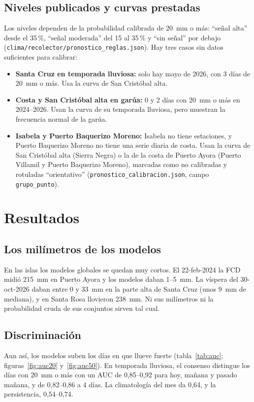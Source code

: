 \documentclass{sosg-informe}
\begin{document}
\subsection{Niveles publicados y curvas prestadas}
Los niveles dependen de la probabilidad calibrada de 20~mm o más: \enquote{señal alta} desde el 35\,\%, \enquote{señal moderada} del 15 al 35\,\% y \enquote{sin señal} por debajo (\texttt{clima/recolector/pronostico\_reglas.json}). Hay tres casos sin datos suficientes para calibrar:
\begin{itemize}
  \item \textbf{Santa Cruz en temporada lluviosa:} solo hay mayo de 2026, con 3 días de 20~mm o más. Usa la curva de San Cristóbal alta.
  \item \textbf{Costa y San Cristóbal alta en garúa:} 0 y 2 días con 20~mm o más en 2024--2026. Usan la curva de su temporada lluviosa, pero muestran la frecuencia normal de la garúa.
  \item \textbf{Isabela y Puerto Baquerizo Moreno:} Isabela no tiene estaciones, y Puerto Baquerizo Moreno no tiene una serie diaria de costa. Usan la curva de San Cristóbal alta (Sierra Negra) o la de la costa de Puerto Ayora (Puerto Villamil y Puerto Baquerizo Moreno), marcadas como no calibradas y rotuladas \enquote{orientativo} (\texttt{pronostico\_calibracion.json}, campo \texttt{grupo\_punto}).
\end{itemize}

\section{Resultados}

\subsection{Los milímetros de los modelos}
En las islas los modelos globales se quedan muy cortos. El 22-feb-2024 la FCD midió 215~mm en Puerto Ayora y los modelos daban 1--5~mm. La víspera del 30-oct-2026 daban entre 0 y 33~mm en la parte alta de Santa Cruz (unos 9~mm de mediana), y en Santa Rosa llovieron 238~mm. Ni sus milímetros ni la probabilidad cruda de sus conjuntos sirven tal cual.

\subsection{Discriminación}
Aun así, los modelos suben los días en que llueve fuerte (tabla~\ref{tab:auc}; figuras~\ref{fig:auc20} y~\ref{fig:auc50}). En temporada lluviosa, el consenso distingue los días con 20~mm o más con un AUC de 0,85--0,92 para hoy, mañana y pasado mañana, y de 0,82--0,86 a 4 días. La climatología del mes da 0,64, y la persistencia, 0,54--0,74.
\end{document}
